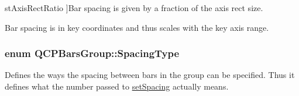 \begin{Desc}
\begin{description}
{st\+Axis\+Rect\+Ratio\hypertarget{class_q_c_p_bars_group_a4c0521120a97e60bbca37677a37075b6a7b43366bb86f2ea96acb884f107c4728}{}\label{class_q_c_p_bars_group_a4c0521120a97e60bbca37677a37075b6a7b43366bb86f2ea96acb884f107c4728}
}]Bar spacing is given by a fraction of the axis rect size. \item[{\em 
st\+Plot\+Coords\hypertarget{class_q_c_p_bars_group_a4c0521120a97e60bbca37677a37075b6a73baa3f808dc74956073b8bb2eec391d}{}\label{class_q_c_p_bars_group_a4c0521120a97e60bbca37677a37075b6a73baa3f808dc74956073b8bb2eec391d}
}]Bar spacing is in key coordinates and thus scales with the key axis range. \end{description}
\end{Desc}
\subsubsection[{\texorpdfstring{Spacing\+Type}{SpacingType}}]{\setlength{\rightskip}{0pt plus 5cm}enum {\bf Q\+C\+P\+Bars\+Group\+::\+Spacing\+Type}}\hypertarget{class_q_c_p_bars_group_a4c0521120a97e60bbca37677a37075b6}{}\label{class_q_c_p_bars_group_a4c0521120a97e60bbca37677a37075b6}
Defines the ways the spacing between bars in the group can be specified. Thus it defines what the number passed to \hyperlink{class_q_c_p_bars_group_aa553d327479d72a0c3dafcc724a190e2}{set\+Spacing} actually means.

